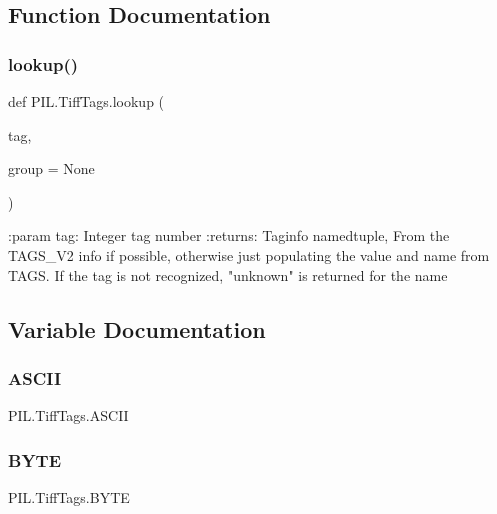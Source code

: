 \subsection{Function Documentation}
\mbox{\label{namespacePIL_1_1TiffTags_a183a06296cacf105013c25c44156ab9b}} 
\subsubsection{\texorpdfstring{lookup()}{lookup()}}
{\footnotesize\ttfamily def P\+I\+L.\+Tiff\+Tags.\+lookup (\begin{DoxyParamCaption}\item[{}]{tag,  }\item[{}]{group = {\ttfamily None} }\end{DoxyParamCaption})}

\begin{DoxyVerb}:param tag: Integer tag number
:returns: Taginfo namedtuple, From the TAGS_V2 info if possible,
    otherwise just populating the value and name from TAGS.
    If the tag is not recognized, "unknown" is returned for the name\end{DoxyVerb}
 

\subsection{Variable Documentation}
\mbox{\label{namespacePIL_1_1TiffTags_aeee60c4a9ac3a18479aeddcb768881bd}} 
\subsubsection{\texorpdfstring{A\+S\+C\+II}{ASCII}}
{\footnotesize\ttfamily P\+I\+L.\+Tiff\+Tags.\+A\+S\+C\+II}

\mbox{\label{namespacePIL_1_1TiffTags_a89c80af0fdefe3b78726ecaefbcdaa94}} 
\subsubsection{\texorpdfstring{B\+Y\+TE}{BYTE}}
{\footnotesize\ttfamily P\+I\+L.\+Tiff\+Tags.\+B\+Y\+TE}



